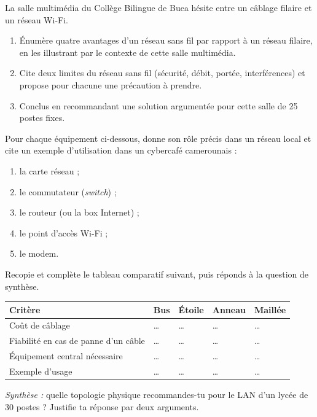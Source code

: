 \documentclass[11pt]{article}
\begin{document}
\begin{exercice}
La salle multimédia du Collège Bilingue de Buea hésite entre un câblage filaire et un réseau Wi-Fi.
\begin{enumerate}
  \item Énumère quatre avantages d'un réseau sans fil par rapport à un réseau filaire, en les illustrant par le contexte de cette salle multimédia.
  \item Cite deux limites du réseau sans fil (sécurité, débit, portée, interférences) et propose pour chacune une précaution à prendre.
  \item Conclus en recommandant une solution argumentée pour cette salle de 25 postes fixes.
\end{enumerate}
\end{exercice}

\begin{exercice}
Pour chaque équipement ci-dessous, donne son rôle précis dans un réseau local et cite un exemple d'utilisation dans un cybercafé camerounais :
\begin{enumerate}
  \item la carte réseau ;
  \item le commutateur (\emph{switch}) ;
  \item le routeur (ou la box Internet) ;
  \item le point d'accès Wi-Fi ;
  \item le modem.
\end{enumerate}
\end{exercice}

\begin{exercice}
Recopie et complète le tableau comparatif suivant, puis réponds à la question de synthèse.

\begin{center}
\begin{tabularx}{\linewidth}{|l|X|X|X|X|}
\hline
\rowcolor{popblueL} \textbf{Critère} & \textbf{Bus} & \textbf{Étoile} & \textbf{Anneau} & \textbf{Maillée} \\
\hline
Coût de câblage & \ldots & \ldots & \ldots & \ldots \\
\hline
Fiabilité en cas de panne d'un câble & \ldots & \ldots & \ldots & \ldots \\
\hline
Équipement central nécessaire & \ldots & \ldots & \ldots & \ldots \\
\hline
Exemple d'usage & \ldots & \ldots & \ldots & \ldots \\
\hline
\end{tabularx}
\end{center}

\emph{Synthèse :} quelle topologie physique recommandes-tu pour le LAN d'un lycée de 30 postes ? Justifie ta réponse par deux arguments.
\end{exercice}
\end{document}
